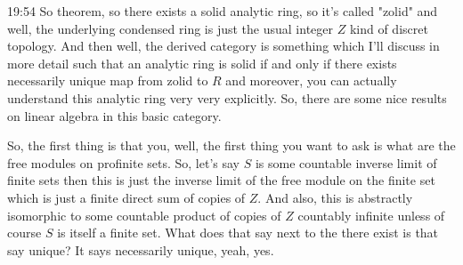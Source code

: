 \begin{unfinished}{19:54}
So theorem, so there exists a solid analytic ring, so it's called "zolid" and well, the underlying condensed ring is just the usual integer $Z$ kind of discret topology. And then well, the derived category is something which I'll discuss in more detail such that an analytic ring is solid if and only if there exists necessarily unique map from zolid to $R$ and moreover, you can actually understand this analytic ring very very explicitly. So, there are some nice results on linear algebra in this basic category.

So, the first thing is that you, well, the first thing you want to ask is what are the free modules on profinite sets. So, let's say $S$ is some countable inverse limit of finite sets then this is just the inverse limit of the free module on the finite set which is just a finite direct sum of copies of $Z$. And also, this is abstractly isomorphic to some countable product of copies of $Z$ countably infinite unless of course $S$ is itself a finite set. What does that say next to the there exist is that say unique? It says necessarily unique, yeah, yes. 


\end{unfinished}

